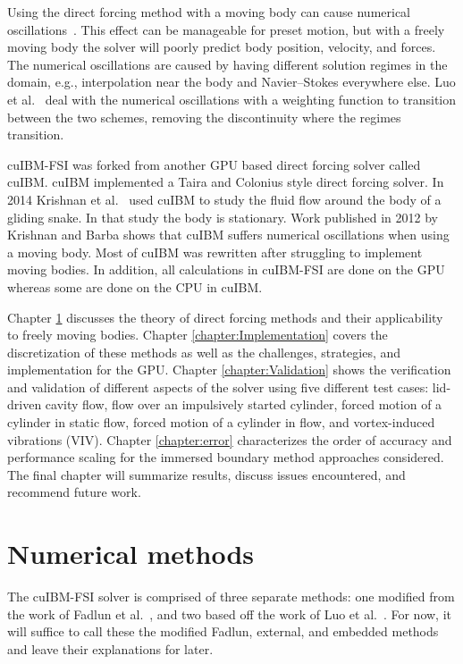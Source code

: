 Using the direct forcing method with a moving body can cause numerical oscillations~\cite{liao2010simulating,Luo:2012gx}.
This effect can be manageable for preset motion, but with a freely moving body the solver will poorly predict body position, velocity, and forces. 
The numerical oscillations are caused by having different solution regimes in the domain, e.g., interpolation near the body and Navier--Stokes everywhere else. 
Luo et al.~\cite{Luo:2012gx} deal with the numerical oscillations with a weighting function to transition between the two schemes, removing the discontinuity where the regimes transition. 

cuIBM-FSI was forked from another GPU based direct forcing solver called cuIBM\cite{layton2011cuibm}. 
cuIBM implemented a Taira and Colonius\cite{Taira:2007jl} style direct forcing solver. 
In 2014 Krishnan et al.~\cite{krishnan2014lift} used cuIBM to study the fluid flow around the body of a gliding snake. 
In that study the body is stationary. 
Work published in 2012 by Krishnan and  Barba\cite{krishnan2012validation} shows that cuIBM suffers numerical oscillations when using a moving body. 
Most of cuIBM was rewritten after struggling to implement moving bodies. 
In addition, all calculations in cuIBM-FSI are done on the GPU whereas some are done on the CPU in cuIBM.

Chapter \ref{chapter:Numerical Methods} discusses the theory of direct forcing methods and their applicability to freely moving bodies. 
Chapter \ref{chapter:Implementation} covers the discretization of these methods as well as the challenges, strategies, and implementation for the GPU. 
Chapter \ref{chapter:Validation} shows the verification and validation of different aspects of the solver using five different test cases: lid-driven cavity flow, flow over an impulsively started cylinder, forced motion of a cylinder in static flow, forced motion of a cylinder in flow, and vortex-induced vibrations (VIV). 
Chapter \ref{chapter:error} characterizes the order of accuracy and performance scaling for the immersed boundary method approaches considered. 
The final chapter will summarize results, discuss issues encountered, and recommend future work.

\chapter{Numerical methods}\label{chapter:Numerical Methods}
The cuIBM-FSI solver is comprised of three separate methods: 
one modified from the work of Fadlun et al.~\cite{Fadlun:2000fl}, and two based off the work of Luo et al.~\cite{Luo:2012gx}. 
For now, it will suffice to call these the modified Fadlun, external, and embedded methods and leave their explanations for later. 

